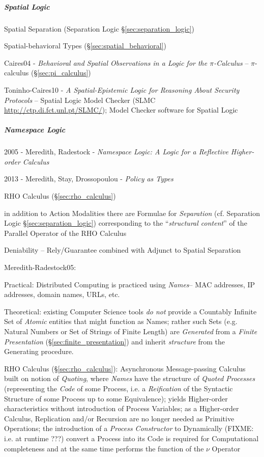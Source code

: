 \subparagraph{Spatial Logic}\label{sec:spatial_logic}
\hfill

Spatial Separation (Separation Logic \S\ref{sec:separation_logic})

Spatial-behavioral Types (\S\ref{sec:spatial_behavioral})

Caires04 - \emph{Behavioral and Spatial Observations in a Logic for the
  $\pi$-Calculus} -- $\pi$-calculus (\S\ref{sec:pi_calculus})

Toninho-Caires10 -
\emph{A Spatial-Epistemic Logic for Reasoning About Security Protocols} --
Spatial Logic Model Checker (SLMC \url{http://ctp.di.fct.unl.pt/SLMC/}); Model
Checker software for Spatial Logic



\subparagraph{Namespace Logic}\label{sec:namespace_logic}
\hfill

2005 - Meredith, Radestock - \emph{Namespace Logic: A Logic for a Reflective
  Higher-order Calculus}

2013 - Meredith, Stay, Drossopoulou - \emph{Policy as Types}

RHO Calculus (\S\ref{sec:rho_calculus})

in addition to Action Modalities there are Formulae for \emph{Separation} (cf.
Separation Logic \S\ref{sec:separation_logic}) corresponding to the
``\emph{structural content}'' of the Parallel Operator of the RHO Calculus

Deniability -- Rely/Guarantee combined with Adjunct to Spatial Separation

\asterism

Meredith-Radestock05:

Practical: Distributed Computing is practiced using \emph{Names}-- MAC
addresses, IP addresses, domain names, URLs, etc.

Theoretical: existing Computer Science tools \emph{do not} provide a Countably
Infinite Set of \emph{Atomic} entities that might function as Names; rather such
Sets (e.g. Natural Numbers or Set of Strings of Finite Length) are
\emph{Generated} from a \emph{Finite Presentation}
(\S\ref{sec:finite_presentation}) and inherit \emph{structure} from the
Generating procedure.

RHO Calculus (\S\ref{sec:rho_calculus}): Asynchronous Message-passing Calculus
built on notion of \emph{Quoting}, where \emph{Names} have the structure of
\emph{Quoted Processes} (representing the \emph{Code} of some Process, i.e. a
\emph{Reification} of the Syntactic Structure of some Process up to some
Equivalence); yields Higher-order characteristics without introduction of
Process Variables; as a Higher-order Calculus, Replication and/or Recursion are
no longer needed as Primitive Operations; the introduction of a \emph{Process
  Constructor} to Dynamically (FIXME: i.e. at runtime ???) convert a Process
into its Code is required for Computational completeness and at the same time
performs the function of the $\nu$ Operator

